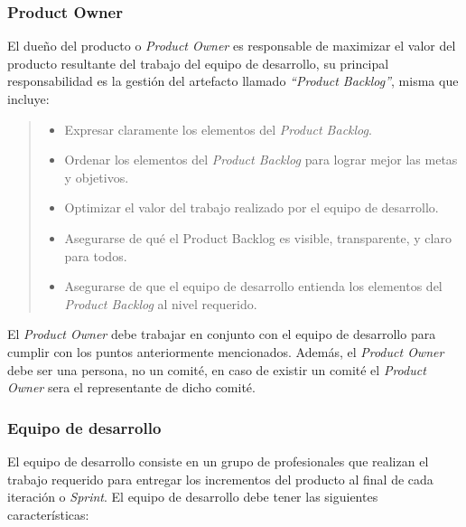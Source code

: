 \subsubsection{Product Owner} 

 \noindent El dueño del producto o {\em Product Owner} es responsable de maximizar el valor
 del producto resultante del trabajo del equipo de desarrollo, su principal responsabilidad
 es la gestión del artefacto llamado {\em``Product Backlog''}, misma que incluye:
   
    \begin{quote}
    \begin{itemize}
        \item Expresar claramente los elementos del {\it Product Backlog}.
        \item Ordenar los elementos del {\it Product Backlog} para lograr mejor las metas y objetivos.
        \item Optimizar el valor del trabajo realizado por el equipo de desarrollo.
        \item Asegurarse de qué el Product Backlog es visible, transparente, y claro para todos.
        \item Asegurarse de que el equipo de desarrollo entienda los elementos del {\it Product Backlog}
                al nivel requerido.\\
    \end{itemize}
    \end{quote}
    
 \noindent El {\it Product Owner} debe trabajar en conjunto con el equipo de desarrollo para cumplir con
 los puntos anteriormente mencionados. Además, el {\it Product Owner} debe ser una persona, no un comité,
 en caso de existir un comité el {\it Product Owner} sera el representante de dicho comité.
    
\subsubsection{Equipo de desarrollo}

 El equipo de desarrollo consiste en un grupo de profesionales que realizan el trabajo requerido para
 entregar los incrementos del producto al final de cada iteración o {\it Sprint}. El equipo de desarrollo
 debe tener las siguientes características:
    
